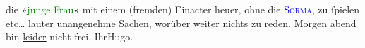                die »\textcolor{green}{junge Frau}{}\ledrightnote{\textcolor{green}{Die Frau im Fenster}}« mit einem (fremden) Einacter
               heuer, ohne die \textcolor{blue}{\textsc{Sorma}}{}\ledrightnote{\textcolor{blue}{Agnes Sorma}}, zu ſpielen etc{\dots} lauter unangenehme Sachen, worüber
               weiter nichts zu reden. Morgen{ }abend bin \uline{leider} nicht frei.\pend
           \pstart Ihr\spacefill\mbox{Hugo.}\pend{}\endnumbering{}  
      